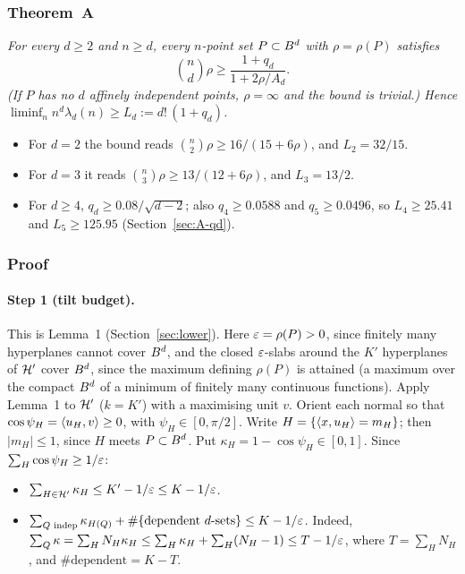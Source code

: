 \subsubsection*{Theorem~A}

\begingroup\itshape\sloppy
For every $d \ge 2$ and $n \ge d$, every $n$-point set $P \subset B^d$ with $\rho = \rho(P)$
satisfies
\begin{equation*}
  \binom{n}{d} \rho \ge \frac{1 + q_d}{1 + 2\rho/A_d}.
\end{equation*}
(If $P$ has no $d$ affinely independent points, $\rho = \infty$ and the bound is trivial.) Hence
$\liminf_n n^d \lambda_d(n) \ge L_d := d!\,(1 + q_d)$.
\begin{itemize}
  \item For $d = 2$ the bound reads $\binom{n}{2}\rho \ge 16/(15 + 6\rho)$, and $L_2 = 32/15$.
  \item For $d = 3$ it reads $\binom{n}{3}\rho \ge 13/(12 + 6\rho)$, and $L_3 = 13/2$.
  \item For $d \ge 4$, $q_d \ge 0.08/\sqrt{d-2}$; also $q_4 \ge 0.0588$ and $q_5 \ge 0.0496$, so
    $L_4 \ge 25.41$ and $L_5 \ge 125.95$ (Section~\ref{sec:A-qd}).
\end{itemize}
\endgroup

\subsubsection*{Proof}

\paragraph{Step 1 (tilt budget).} This is Lemma~1 (Section~\ref{sec:lower}). Here $\varepsilon = \rho(P) > 0$, since finitely many hyperplanes cannot cover $B^d$, and the closed
$\varepsilon$-slabs around the $K'$ hyperplanes of $\mathcal{H}'$ cover $B^d$, since the maximum defining
$\rho(P)$ is attained (a maximum over the compact $B^d$ of a minimum of finitely many continuous
functions). Apply Lemma~1 to $\mathcal{H}'$ ($k = K'$) with a maximising unit $v$. Orient each normal so that
$\cos\psi_H = \langle u_H,v\rangle \ge 0$, with $\psi_H \in [0, \pi/2]$. Write
$H = \{\langle x,u_H\rangle = m_H\}$; then $|m_H| \le 1$, since $H$ meets $P \subset B^d$. Put
$\kappa_H = 1 - \cos\psi_H \in [0, 1]$. Since $\sum_H \cos\psi_H \ge 1/\varepsilon$:
\begin{itemize}
  \item[(1a)] $\sum_{H \in \mathcal{H}'} \kappa_H \le K' - 1/\varepsilon \le K - 1/\varepsilon$.
  \item[(1b)] $\sum_{Q \text{ indep}} \kappa_{H(Q)} + \#\{\text{dependent } d\text{-sets}\} \le
    K - 1/\varepsilon$. Indeed,
    $\sum_Q \kappa = \sum_H N_H \kappa_H \le \sum_H \kappa_H + \sum_H (N_H - 1) \le T - 1/\varepsilon$,
    where $T = \sum_H N_H$, and $\#\text{dependent} = K - T$.
\end{itemize}

